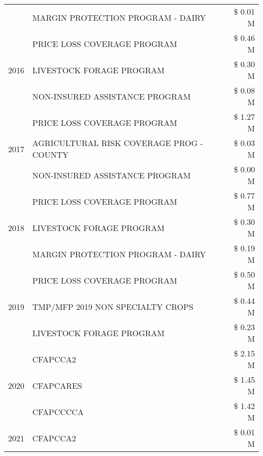 \begin{tabular}{llr}
 & MARGIN PROTECTION PROGRAM - DAIRY & \$ 0.01 M \\
\cline{1-3}
\multirow[t]{3}{*}{2016} & PRICE LOSS COVERAGE PROGRAM & \$ 0.46 M \\
 & LIVESTOCK FORAGE PROGRAM & \$ 0.30 M \\
 & NON-INSURED ASSISTANCE PROGRAM & \$ 0.08 M \\
\cline{1-3}
\multirow[t]{3}{*}{2017} & PRICE LOSS COVERAGE PROGRAM & \$ 1.27 M \\
 & AGRICULTURAL RISK COVERAGE PROG - COUNTY & \$ 0.03 M \\
 & NON-INSURED ASSISTANCE PROGRAM & \$ 0.00 M \\
\cline{1-3}
\multirow[t]{3}{*}{2018} & PRICE LOSS COVERAGE PROGRAM & \$ 0.77 M \\
 & LIVESTOCK FORAGE PROGRAM & \$ 0.30 M \\
 & MARGIN PROTECTION PROGRAM - DAIRY & \$ 0.19 M \\
\cline{1-3}
\multirow[t]{3}{*}{2019} & PRICE LOSS COVERAGE PROGRAM & \$ 0.50 M \\
 & TMP/MFP 2019 NON SPECIALTY CROPS & \$ 0.44 M \\
 & LIVESTOCK FORAGE PROGRAM & \$ 0.23 M \\
\cline{1-3}
\multirow[t]{3}{*}{2020} & CFAPCCA2 & \$ 2.15 M \\
 & CFAPCARES & \$ 1.45 M \\
 & CFAPCCCCA & \$ 1.42 M \\
\cline{1-3}
2021 & CFAPCCA2 & \$ 0.01 M \\
\cline{1-3}
\bottomrule
\end{tabular}
